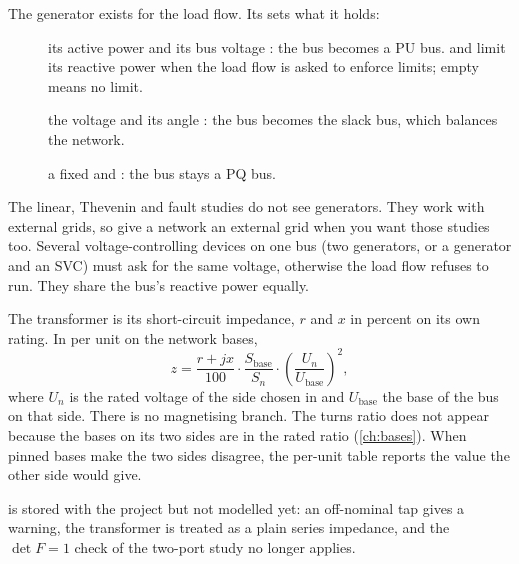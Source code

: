 The generator exists for the load flow. Its  sets what it holds:

\begin{description}
  \item[] its active power  and its bus voltage : the bus becomes
    a PU bus.  and  limit its reactive power when the load flow is
    asked to enforce limits; empty means no limit.
  \item[] the voltage  and its angle : the bus becomes
    the slack bus, which balances the network.
  \item[] a fixed  and : the bus stays a PQ bus.
\end{description}

The linear, Thevenin and fault studies do not see generators. They work with external
grids, so give a network an external grid when you want those studies too. Several
voltage-controlling devices on one bus (two generators, or a generator and an SVC) must
ask for the same voltage, otherwise the load flow refuses to run. They share the bus's
reactive power equally.




The transformer is its short-circuit impedance, $r$ and $x$ in percent on its own rating.
In per unit on the network bases,
\[
  z = \frac{r + jx}{100}\cdot\frac{S_\text{base}}{S_n}\cdot
      \left(\frac{U_n}{U_\text{base}}\right)^2,
\]
where $U_n$ is the rated voltage of the side chosen in  and
$U_\text{base}$ the base of the bus on that side. There is no magnetising branch. The
turns ratio does not appear because the bases on its two sides are in the rated ratio
(\cref{ch:bases}). When pinned bases make the two sides disagree, the per-unit table
reports the value the other side would give.

\begin{caution}
 is stored with the project but not modelled yet: an off-nominal tap gives
a warning, the transformer is treated as a plain series impedance, and the $\det F = 1$
check of the two-port study no longer applies.
\end{caution}

